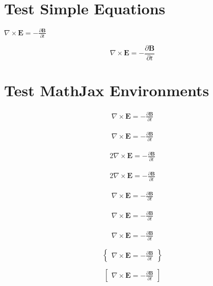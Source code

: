 \documentclass[]{article}
\date{}
\begin{document}
\section{Test Simple Equations}\label{test-simple-equations}

\(\nabla \times \mathbf{E} = - \frac{\partial \mathbf{B}}{\partial t}\)

\[\nabla \times \mathbf{E} = - \frac{\partial \mathbf{B}}{\partial t}\]

\section{Test MathJax Environments}\label{test-mathjax-environments}

\begin{align}
\nabla \times \mathbf{E} = - \frac{\partial \mathbf{B}}{\partial t}
\end{align}

\begin{align*}
\nabla \times \mathbf{E} = - \frac{\partial \mathbf{B}}{\partial t}
\end{align*}

\begin{alignat}{2}
\nabla \times \mathbf{E} = - \frac{\partial \mathbf{B}}{\partial t}
\end{alignat}

\begin{alignat*}{2}
\nabla \times \mathbf{E} = - \frac{\partial \mathbf{B}}{\partial t}
\end{alignat*}

\[\begin{aligned}
\nabla \times \mathbf{E} = - \frac{\partial \mathbf{B}}{\partial t}
\end{aligned}\]

\[\begin{alignedat}{2}
\nabla \times \mathbf{E} = - \frac{\partial \mathbf{B}}{\partial t}
\end{alignedat}\]

\[\begin{array}{lcl}
\nabla \times \mathbf{E} = - \frac{\partial \mathbf{B}}{\partial t}
\end{array}\]

\[\begin{Bmatrix}
\nabla \times \mathbf{E} = - \frac{\partial \mathbf{B}}{\partial t}
\end{Bmatrix}\]

\[\begin{bmatrix}
\nabla \times \mathbf{E} = - \frac{\partial \mathbf{B}}{\partial t}
\end{bmatrix}\]
\end{document}
